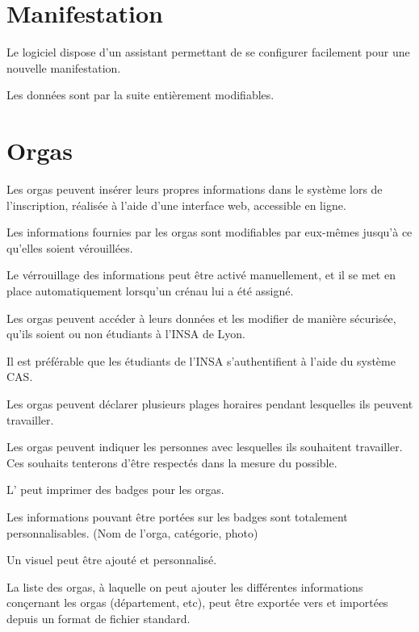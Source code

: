 \section{Manifestation}



Le logiciel dispose d'un assistant permettant de se configurer facilement pour une nouvelle manifestation.

Les données sont par la suite entièrement modifiables.



\section{Orgas}



Les orgas peuvent insérer leurs propres informations dans le système lors de l'inscription, réalisée à l'aide d'une interface web, accessible en ligne.

Les informations fournies par les orgas sont modifiables par eux-mêmes jusqu'à ce qu'elles soient vérouillées.

Le vérrouillage des informations peut être activé manuellement, et il se met en place automatiquement lorsqu'un crénau lui a été assigné.

Les orgas peuvent accéder à leurs données et les modifier de manière sécurisée, qu'ils soient ou non étudiants à l'INSA de Lyon.

Il est préférable que les étudiants de l'INSA s'authentifient à l'aide du système CAS.

Les orgas peuvent déclarer plusieurs plages horaires pendant lesquelles ils peuvent travailler.

Les orgas peuvent indiquer les personnes avec lesquelles ils souhaitent travailler. Ces souhaits tenterons d'être respectés dans la mesure du possible.

L'\oh{} peut imprimer des badges pour les orgas.

Les informations pouvant être portées sur les badges sont totalement personnalisables. (Nom de l'orga, catégorie, photo)

Un visuel peut être ajouté et personnalisé.


La liste des orgas, à laquelle on peut ajouter les différentes informations conçernant les orgas (département, etc), peut être exportée vers et importées depuis un format de fichier standard.



